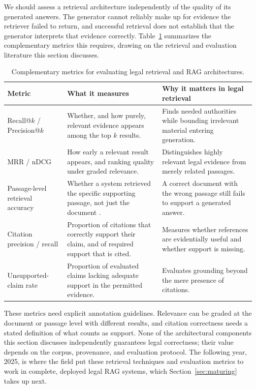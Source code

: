 We should assess a retrieval architecture independently of the quality of its generated answers.
The generator cannot reliably make up for evidence the retriever failed to return, and successful
retrieval does not establish that the generator interprets that evidence correctly.
Table~\ref{tab:metrics} summarizes the complementary metrics this requires, drawing on the
retrieval and evaluation literature this section discusses.

\begin{table}[tp]
\centering
\caption{Complementary metrics for evaluating legal retrieval and RAG architectures.}
\label{tab:metrics}
\footnotesize
\setlength{\tabcolsep}{5pt}
\renewcommand{\arraystretch}{1.25}
\begin{tabularx}{\textwidth}{>{\raggedright\arraybackslash}p{4.0cm} >{\raggedright\arraybackslash}X >{\raggedright\arraybackslash}X}
\toprule
\textbf{Metric} & \textbf{What it measures} & \textbf{Why it matters in legal retrieval} \\
\midrule
Recall@$k$ / Precision@$k$ & Whether, and how purely, relevant evidence appears among the top $k$ results. & Finds needed authorities while bounding irrelevant material entering generation. \\
MRR / nDCG & How early a relevant result appears, and ranking quality under graded relevance. & Distinguishes highly relevant legal evidence from merely related passages. \\
Passage-level retrieval accuracy & Whether a system retrieved the specific supporting passage, not just the document \citep{pipitone2024}. & A correct document with the wrong passage still fails to support a generated answer. \\
Citation precision / recall & Proportion of citations that correctly support their claim, and of required support that is cited. & Measures whether references are evidentially useful and whether support is missing. \\
Unsupported-claim rate & Proportion of evaluated claims lacking adequate support in the permitted evidence. & Evaluates grounding beyond the mere presence of citations. \\
\bottomrule
\end{tabularx}
\end{table}

These metrics need explicit annotation guidelines. Relevance can be graded at the document or
passage level with different results, and citation correctness needs a stated definition of what
counts as support. None of the architectural components this section discusses independently
guarantees legal correctness; their value depends on the corpus, provenance, and evaluation
protocol. The following year, 2025, is where the field put these retrieval techniques and evaluation
metrics to work in complete, deployed legal RAG systems, which Section~\ref{sec:maturing} takes up
next.

